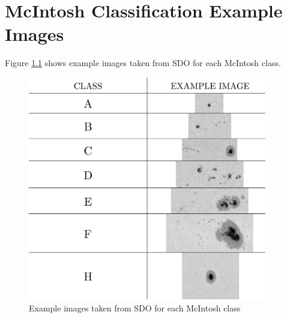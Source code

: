 \chapter{McIntosh Classification Example Images}
\label{appendiceB}
\thispagestyle{empty}
Figure \ref{fig:mcintosh} shows example images taken from SDO for each McIntosh class.
\begin{figure}[h!]
    \centering
    \captionsetup{justification=centering}
    \includegraphics[width=0.93\textwidth]{./pictures/mcintosh-classification}
    \caption{Example images taken from SDO for each McIntosh class}
    \label{fig:mcintosh}
\end{figure}
